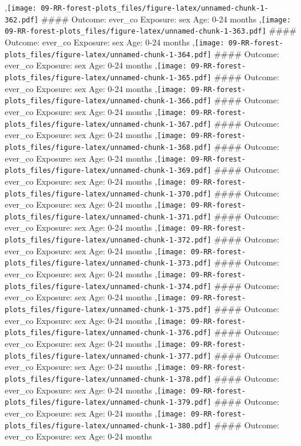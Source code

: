 \documentclass[
  9pt,
]{book}
\begin{document}
,\texttt{[image: 09-RR-forest-plots\_files/figure-latex/unnamed-chunk-1-362.pdf]}
\#\#\#\# Outcome: ever\_co Exposure: sex Age: 0-24 months
,\texttt{[image: 09-RR-forest-plots\_files/figure-latex/unnamed-chunk-1-363.pdf]}
\#\#\#\# Outcome: ever\_co Exposure: sex Age: 0-24 months
,\texttt{[image: 09-RR-forest-plots\_files/figure-latex/unnamed-chunk-1-364.pdf]}
\#\#\#\# Outcome: ever\_co Exposure: sex Age: 0-24 months
,\texttt{[image: 09-RR-forest-plots\_files/figure-latex/unnamed-chunk-1-365.pdf]}
\#\#\#\# Outcome: ever\_co Exposure: sex Age: 0-24 months
,\texttt{[image: 09-RR-forest-plots\_files/figure-latex/unnamed-chunk-1-366.pdf]}
\#\#\#\# Outcome: ever\_co Exposure: sex Age: 0-24 months
,\texttt{[image: 09-RR-forest-plots\_files/figure-latex/unnamed-chunk-1-367.pdf]}
\#\#\#\# Outcome: ever\_co Exposure: sex Age: 0-24 months
,\texttt{[image: 09-RR-forest-plots\_files/figure-latex/unnamed-chunk-1-368.pdf]}
\#\#\#\# Outcome: ever\_co Exposure: sex Age: 0-24 months
,\texttt{[image: 09-RR-forest-plots\_files/figure-latex/unnamed-chunk-1-369.pdf]}
\#\#\#\# Outcome: ever\_co Exposure: sex Age: 0-24 months
,\texttt{[image: 09-RR-forest-plots\_files/figure-latex/unnamed-chunk-1-370.pdf]}
\#\#\#\# Outcome: ever\_co Exposure: sex Age: 0-24 months
,\texttt{[image: 09-RR-forest-plots\_files/figure-latex/unnamed-chunk-1-371.pdf]}
\#\#\#\# Outcome: ever\_co Exposure: sex Age: 0-24 months
,\texttt{[image: 09-RR-forest-plots\_files/figure-latex/unnamed-chunk-1-372.pdf]}
\#\#\#\# Outcome: ever\_co Exposure: sex Age: 0-24 months
,\texttt{[image: 09-RR-forest-plots\_files/figure-latex/unnamed-chunk-1-373.pdf]}
\#\#\#\# Outcome: ever\_co Exposure: sex Age: 0-24 months
,\texttt{[image: 09-RR-forest-plots\_files/figure-latex/unnamed-chunk-1-374.pdf]}
\#\#\#\# Outcome: ever\_co Exposure: sex Age: 0-24 months
,\texttt{[image: 09-RR-forest-plots\_files/figure-latex/unnamed-chunk-1-375.pdf]}
\#\#\#\# Outcome: ever\_co Exposure: sex Age: 0-24 months
,\texttt{[image: 09-RR-forest-plots\_files/figure-latex/unnamed-chunk-1-376.pdf]}
\#\#\#\# Outcome: ever\_co Exposure: sex Age: 0-24 months
,\texttt{[image: 09-RR-forest-plots\_files/figure-latex/unnamed-chunk-1-377.pdf]}
\#\#\#\# Outcome: ever\_co Exposure: sex Age: 0-24 months
,\texttt{[image: 09-RR-forest-plots\_files/figure-latex/unnamed-chunk-1-378.pdf]}
\#\#\#\# Outcome: ever\_co Exposure: sex Age: 0-24 months
,\texttt{[image: 09-RR-forest-plots\_files/figure-latex/unnamed-chunk-1-379.pdf]}
\#\#\#\# Outcome: ever\_co Exposure: sex Age: 0-24 months
,\texttt{[image: 09-RR-forest-plots\_files/figure-latex/unnamed-chunk-1-380.pdf]}
\#\#\#\# Outcome: ever\_co Exposure: sex Age: 0-24 months
\end{document}
